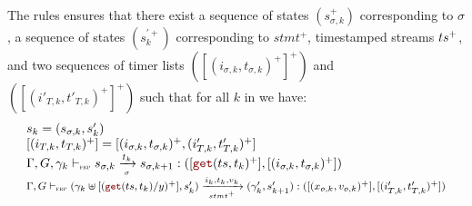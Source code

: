 \begin{skippableproof}
\begin{itemize}
\begin{itemize}
                        The rules  ensures that
                        there exist a sequence of states $(s_{\sigma, k}^+)$ corresponding to
                        $\sigma$, a sequence of states $(s_k^{\prime+})$ corresponding to $stmt^+$,
                        timestamped streams $ts^+$, and two sequences of timer lists
                        $([(i_{\sigma, k},t_{\sigma, k})^+]^+)$ and $([(i'_{T, k}, t'_{T, k})^+]^+)$
                        such that for all $k$ in \N we have:
                        \begin{equation*}
                            \begin{array}{l}
                                s_k = (s_{\sigma, k}, s'_k)                                                               \\
                                {[(i_{T, k}, t_{T, k})^+] = [(i_{\sigma, k}, t_{\sigma, k})^+, (i'_{T, k}, t'_{T, k})^+]} \\
                                \sigmaOpSem{\gamma_k}{s_{\sigma, k}}{\sigma}{t_k}{s_{\sigma, k+1}}{\getAt{\ts}{t_k}^+}
                                {(i_{\sigma, k}, t_{\sigma, k})^+}                                                        \\
                                \mathfoot{\stmtOpSem{\gamma_k \ctxconcat [(\getAt{\ts}{t_k}/y)^+]}{s'_k}{stmt^+}{i_k, t_k, v_k}{\gamma'_k}
                                {s'_{k+1}}{(x_{o, k}, v_{o, k})^+}{(i'_{T, k}, t'_{T, k})^+}}                             \\
                            \end{array}
                        \end{equation*}


\end{itemize}
\end{itemize}
\end{skippableproof}
